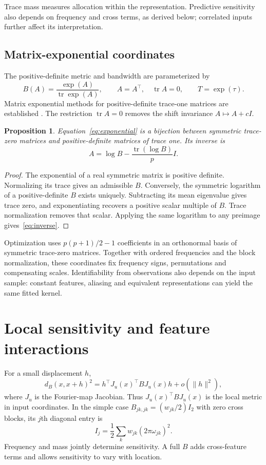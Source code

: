 \documentclass[11pt]{article}
\newcommand{\tr}{\operatorname{tr}}
\newtheorem{proposition}{Proposition}
\begin{document}
Trace mass measures allocation within the representation. Predictive sensitivity also depends on frequency and cross terms, as derived below; correlated inputs further affect its interpretation.

\subsection{Matrix-exponential coordinates}
The positive-definite metric and bandwidth are parameterized by
\begin{equation}
 B(A)=\frac{\exp(A)}{\tr\exp(A)},\qquad A=A^\top,\quad\tr A=0,
 \qquad T=\exp(\tau).
 \label{eq:exponential}
\end{equation}
Matrix exponential methods for positive-definite trace-one matrices are established \cite{tsuda2005}. The restriction $\tr A=0$ removes the shift invariance $A\mapsto A+cI$.

\begin{proposition}
Equation~\eqref{eq:exponential} is a bijection between symmetric trace-zero matrices and positive-definite matrices of trace one. Its inverse is
\begin{equation}
 A=\log B-\frac{\tr(\log B)}p I.
 \label{eq:inverse}
\end{equation}
\end{proposition}
\begin{proof}
The exponential of a real symmetric matrix is positive definite. Normalizing its trace gives an admissible $B$. Conversely, the symmetric logarithm of a positive-definite $B$ exists uniquely. Subtracting its mean eigenvalue gives trace zero, and exponentiating recovers a positive scalar multiple of $B$. Trace normalization removes that scalar. Applying the same logarithm to any preimage gives~\eqref{eq:inverse}.
\end{proof}

Optimization uses $p(p+1)/2-1$ coefficients in an orthonormal basis of symmetric trace-zero matrices. Together with ordered frequencies and the block normalization, these coordinates fix frequency signs, permutations and compensating scales. Identifiability from observations also depends on the input sample: constant features, aliasing and equivalent representations can yield the same fitted kernel.

\section{Local sensitivity and feature interactions}
For a small displacement $h$,
\begin{equation}
 d_B(x,x+h)^2=h^\top J_u(x)^\top B J_u(x)h+o(\|h\|^2),
 \label{eq:local}
\end{equation}
where $J_u$ is the Fourier-map Jacobian. Thus $J_u(x)^\top B J_u(x)$ is the local metric in input coordinates. In the simple case $B_{jk,jk}=(w_{jk}/2)I_2$ with zero cross blocks, its $j$th diagonal entry is
\begin{equation}
 I_j=\frac12\sum_k w_{jk}(2\pi\omega_{jk})^2.
\end{equation}
Frequency and mass jointly determine sensitivity. A full $B$ adds cross-feature terms and allows sensitivity to vary with location.
\end{document}
